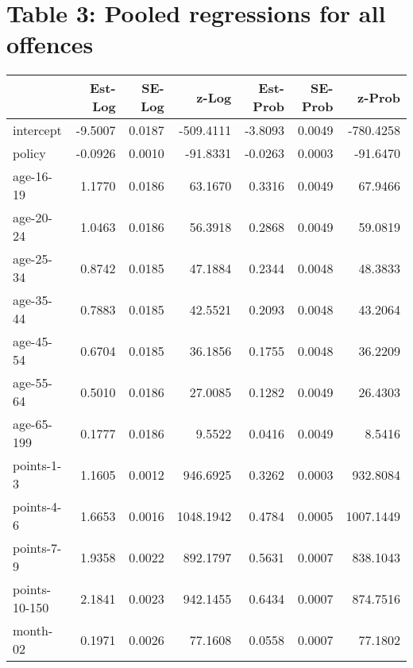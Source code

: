 \documentclass[10pt]{article}
\begin{document}






\section{Table 3: Pooled regressions for all offences}




\begin{table}[ht]
\centering
\begin{tabular}{lrrrrrr}
  \hline
 & Est-Log & SE-Log & z-Log & Est-Prob & SE-Prob & z-Prob \\ 
  \hline
intercept & -9.5007 & 0.0187 & -509.4111 & -3.8093 & 0.0049 & -780.4258 \\ 
  policy & -0.0926 & 0.0010 & -91.8331 & -0.0263 & 0.0003 & -91.6470 \\ 
  age-16-19 & 1.1770 & 0.0186 & 63.1670 & 0.3316 & 0.0049 & 67.9466 \\ 
  age-20-24 & 1.0463 & 0.0186 & 56.3918 & 0.2868 & 0.0049 & 59.0819 \\ 
  age-25-34 & 0.8742 & 0.0185 & 47.1884 & 0.2344 & 0.0048 & 48.3833 \\ 
  age-35-44 & 0.7883 & 0.0185 & 42.5521 & 0.2093 & 0.0048 & 43.2064 \\ 
  age-45-54 & 0.6704 & 0.0185 & 36.1856 & 0.1755 & 0.0048 & 36.2209 \\ 
  age-55-64 & 0.5010 & 0.0186 & 27.0085 & 0.1282 & 0.0049 & 26.4303 \\ 
  age-65-199 & 0.1777 & 0.0186 & 9.5522 & 0.0416 & 0.0049 & 8.5416 \\ 
  points-1-3 & 1.1605 & 0.0012 & 946.6925 & 0.3262 & 0.0003 & 932.8084 \\ 
  points-4-6 & 1.6653 & 0.0016 & 1048.1942 & 0.4784 & 0.0005 & 1007.1449 \\ 
  points-7-9 & 1.9358 & 0.0022 & 892.1797 & 0.5631 & 0.0007 & 838.1043 \\ 
  points-10-150 & 2.1841 & 0.0023 & 942.1455 & 0.6434 & 0.0007 & 874.7516 \\ 
  month-02 & 0.1971 & 0.0026 & 77.1608 & 0.0558 & 0.0007 & 77.1802 \\ 

\end{tabular}
\end{table}
\end{document}
